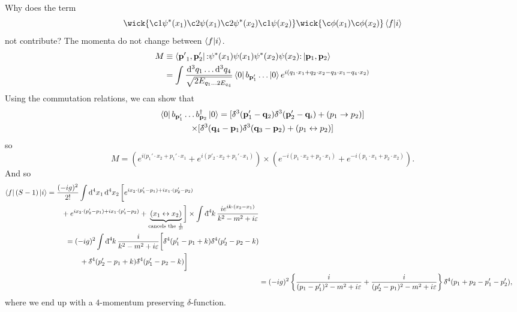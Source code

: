 
Why does the term
\begin{equation}
  \wick{\c1 \psi^*(x_1) \c2 \psi(x_1) \c2 \psi^*(x_2) \c1 \psi(x_2)}\wick{\c \phi(x_1) \c\phi(x_2)} \bra{f}\ket{i}
\end{equation}
not contribute?
The momenta do not change between $\bra{f}\ket{i}$.
\begin{align}
  M &\equiv \bra{\vb{p'}_1, \vb{p}_2'} \mathop{:}\nolimits\!\psi^*(x_1) \psi(x_1) \psi^*(x_2) \psi(x_2)\!\mathop{:}\nolimits \ket{\vb{p}_1, \vb{p}_2}  \\
    &= \int \frac{\dd[3]{q_1} \dots \dd[3]{q_4}}{\sqrt{2 E_{q_{1} \dots 2 E_{q_4}}}} \bra{0} b_{\vb{p}_1'} \dots \ket{0} e^{i(q_1 \cdot x_1 + q_2 \cdot x_2 - q_3 \cdot x_1 - q_4 \cdot x_2)}
\end{align}
Using the commutation relations, we can show that
\begin{multline}
  \bra{0} b_{\vb{p}_1'} \dots b^{\dagger}_{\vb{p}_2} \ket{0} = [\delta\hspace*{-0.2em}\bar{}\hspace*{0.2em}^3(\vb{p}_1' - \vb{q}_2) \delta\hspace*{-0.2em}\bar{}\hspace*{0.2em}^3(\vb{p}_2' - \vb{q}_i) + (p_1 \to p_2) ] \\
  \times [\delta\hspace*{-0.2em}\bar{}\hspace*{0.2em}^3(\vb{q}_4 - \vb{p}_1) \delta\hspace*{-0.2em}\bar{}\hspace*{0.2em}^3(\vb{q}_3 - \vb{p}_2) + (p_1 \leftrightarrow p_2)]
\end{multline}
so 
\begin{equation}
  M = \left( e^{i(p_1' \cdot x_2 + p_1' \cdot x_1}  + e^{i(p'_2 \cdot x_2 + p_1' \cdot x_1) }\right) \times \left( e^{-i(p_1 \cdot x_2 + p_2 \cdot x_1)} + e^{-i (p_1 \cdot x_1 + p_2 \cdot x_2)} \right).
\end{equation}
And so 
\begin{align}
  \begin{split}
      \bra{f} (S-1) \ket{i} &= \frac{(-ig)^2}{2!} \int \dd[4]{x_1} \dd[4]{x_2} \biggl[ e^{i x_2 \cdot (p_1' - p_1) + i x_1 \cdot (p_2' - p_2)} \\
    			& \qquad + e^{i x_2 \cdot (p_2' - p_1) + i x_1 \cdot (p_1' -p_2)} + \underbrace{(x_1 \leftrightarrow x_2)}_{\text{cancels the } \frac{1}{2!}} \biggr] \times \int \bdd[4]{k} \frac{i e^{ik \cdot (x_2 - x_1)}}{k^2 - m^2 + i \varepsilon}
  \end{split} \\
  \begin{split}
    &= (-ig)^2 \int \bdd[4]{k} \frac{i}{k^2 - m^2 + i \varepsilon} \biggl[ \bdelta^4(p_1' - p_1 + k) \bdelta^4(p_2' - p_2 - k)  \\
    & \qquad + \bdelta^4(p_2' - p_1 + k) \bdelta^4(p_1' - p_2 - k) \biggr]
  \end{split} \\
			&= (-ig)^2 \left\{ \frac{i}{(p_1 - p_1')^2 - m^2 + i \varepsilon} + \frac{i}{(p_2' - p_1)^2 - m^2 + i\varepsilon} \right\} \bdelta^4(p_1 + p_2 - p_1' - p_2'),
			\label{eq:result}
\end{align} 
where we end up with a $4$-momentum preserving $\delta$-function.

